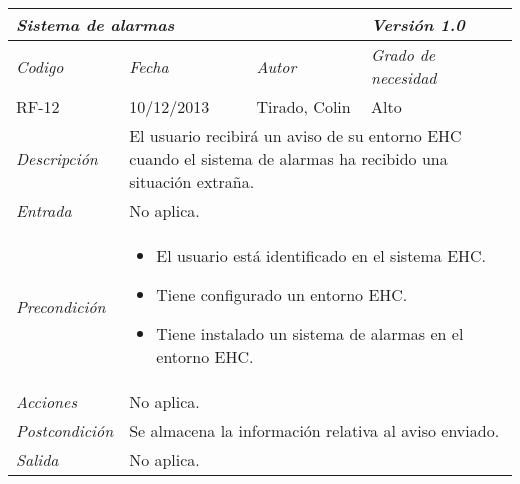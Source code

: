 \begin{center}
    \begin{tabular}{|p{3cm}|p{4cm}|p{4cm}|p{4cm}|}
    \hline \multicolumn{3}{|p{9cm}|}{\textit{Sistema de alarmas}} & \textit{Versi\'on 1.0} \\
    \hline \textit{Codigo} & \textit{Fecha} & \textit{Autor} & \textit{Grado de necesidad} \\
    RF-12 & 10/12/2013 & Tirado, Colin & Alto \\
    \hline \textit{Descripci\'on} & \multicolumn{3}{|p{9cm}|}{El usuario recibir\'a un aviso de su entorno EHC cuando el sistema de alarmas ha recibido una situaci\'on extra\~na.} \\
    \hline \textit{Entrada} & \multicolumn{3}{|p{9cm}|}{No aplica.} \\
    \hline \textit{Precondici\'on} & \multicolumn{3}{|p{9cm}|}{
    \begin{itemize}
    \item El usuario est\'a identificado en el sistema EHC.
    \item Tiene configurado un entorno EHC.
    \item Tiene instalado un sistema de alarmas en el entorno EHC.
    \end{itemize}
    } \\
    \hline \textit{Acciones} & \multicolumn{3}{|p{9cm}|}{No aplica.} \\
    \hline \textit{Postcondici\'on} & \multicolumn{3}{|p{9cm}|}{Se almacena la informaci\'on relativa al aviso enviado.} \\
    \hline \textit{Salida} & \multicolumn{3}{|p{9cm}|}{No aplica.} \\ \hline
    \end{tabular}
\end{center}
